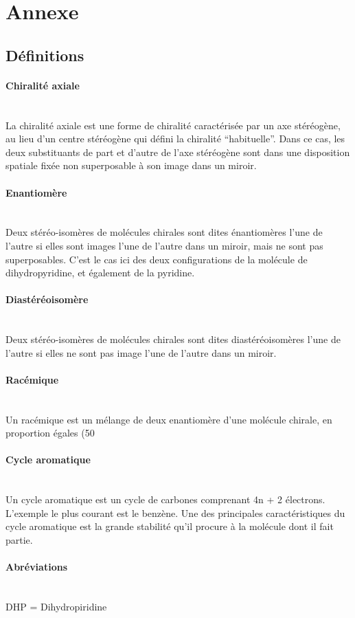 \documentclass{article}
\newcommand{\pparagraph}[1]{\paragraph{#1}\mbox{}\\}
\begin{document}
\newpage



\section{Annexe}

\subsection{Définitions}
\bigskip

\pparagraph{Chiralité axiale}

La chiralité axiale est une forme de chiralité caractérisée par un axe stéréogène, au lieu d’un centre stéréogène qui défini la chiralité “habituelle”. Dans ce cas, les deux substituants de part et d’autre de l’axe stéréogène sont dans une disposition spatiale fixée non superposable à son image dans un miroir.    
\medbreak

\pparagraph{Enantiomère}

Deux stéréo-isomères de molécules chirales sont dites énantiomères l’une de l’autre si elles sont images l’une de l’autre dans un miroir, mais ne sont pas superposables. C’est le cas ici des deux configurations de la molécule de dihydropyridine, et également de la pyridine.

\medbreak
\pparagraph{Diastéréoisomère}

Deux stéréo-isomères de molécules chirales sont dites diastéréoisomères l’une de l’autre si elles ne sont pas image l’une de l’autre dans un miroir.
\medbreak
\pparagraph{Racémique}

Un racémique est un mélange de deux enantiomère d’une molécule chirale, en proportion égales (50%

\medbreak
\pparagraph{Cycle aromatique}

Un cycle aromatique est un cycle de carbones comprenant 4n + 2 électrons. L’exemple le plus courant est le benzène. Une des principales caractéristiques du cycle aromatique est la grande stabilité qu’il procure à la molécule dont il fait partie.

\medbreak
\pparagraph{Abréviations}

DHP = Dihydropiridine




\medbreak
\end{document}
